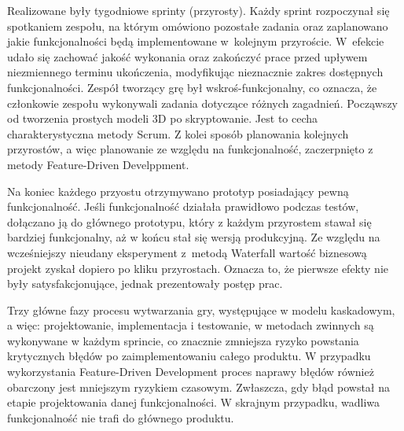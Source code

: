Realizowane były tygodniowe sprinty (przyrosty). Każdy sprint rozpoczynał się spotkaniem zespołu, na którym omówiono pozostałe zadania oraz zaplanowano jakie funkcjonalności będą implementowane w~kolejnym przyroście. W~efekcie udało się zachować jakość wykonania oraz zakończyć prace przed upływem niezmiennego terminu ukończenia, modyfikując nieznacznie zakres dostępnych funkcjonalności. Zespół tworzący grę był wskroś-funkcjonalny, co oznacza, że członkowie zespołu wykonywali zadania dotyczące różnych zagadnień. Począwszy od tworzenia prostych modeli 3D po skryptowanie. Jest to cecha charakterystyczna metody Scrum. Z kolei sposób planowania kolejnych przyrostów, a więc planowanie ze względu na funkcjonalność, zaczerpnięto z metody Feature-Driven Develppment. 

Na koniec każdego przyostu otrzymywano prototyp posiadający pewną funkcjonalność. Jeśli funkcjonalność działała prawidłowo podczas testów, dołączano ją do głównego prototypu, który z każdym przyrostem stawał się bardziej funkcjonalny, aż w końcu stał się wersją produkcyjną. Ze względu na wcześniejszy nieudany eksperyment z~metodą Waterfall wartość biznesową projekt zyskał dopiero po kliku przyrostach. Oznacza to, że pierwsze efekty nie były satysfakcjonujące, jednak prezentowały postęp prac. 

Trzy główne fazy procesu wytwarzania gry, występujące w modelu kaskadowym, a więc: projektowanie, implementacja i testowanie, w metodach zwinnych są wykonywane w każdym sprincie, co znacznie zmniejsza ryzyko powstania krytycznych błędów po zaimplementowaniu całego produktu. W przypadku wykorzystania Feature-Driven Development proces naprawy błędów również obarczony jest mniejszym ryzykiem czasowym. Zwłaszcza, gdy błąd powstał na etapie projektowania danej funkcjonalności. W skrajnym przypadku, wadliwa funkcjonalność nie trafi do głównego produktu.
